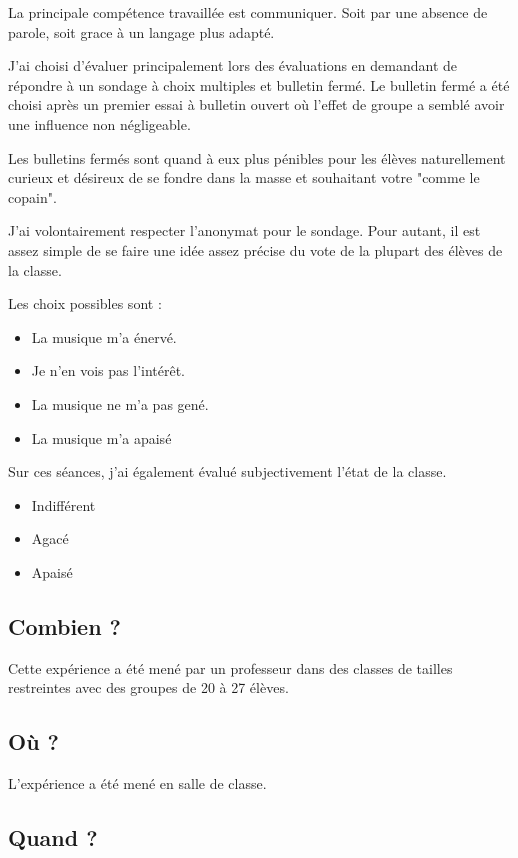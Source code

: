 \documentclass[11pt]{article}
\begin{document}
	La principale compétence travaillée est communiquer. 
	Soit par une absence de parole, soit grace à un langage plus adapté.
	
	J'ai choisi d'évaluer principalement lors des évaluations en demandant de répondre à un sondage à choix multiples et bulletin fermé.
	Le bulletin fermé a été choisi après un premier essai à bulletin ouvert où l’effet de groupe a semblé avoir une influence non négligeable. 
	
	Les bulletins fermés sont quand à eux plus pénibles pour les élèves naturellement curieux et désireux de se fondre dans la masse et souhaitant votre "comme le copain".
	
	J'ai volontairement respecter l'anonymat pour le sondage. Pour autant, il est assez simple de se faire une idée assez précise du vote de la plupart des élèves de la classe.
	
	Les choix possibles sont : 
	
	\begin{itemize}
	\item La musique m'a énervé. 
	      \item Je n'en vois pas l'intérêt.
	      \item La musique ne m'a pas gené.
	      \item La musique m'a apaisé
	\end{itemize}
	
	Sur ces séances, j'ai également évalué subjectivement l'état de la classe.
	
	\begin{itemize}
	\item Indifférent
	      \item Agacé
	      \item Apaisé
	\end{itemize}
	
	\subsection{Combien ?}
	
	Cette expérience a été mené par un professeur dans des classes de tailles restreintes avec des groupes de 20 à 27 élèves.
	
	\subsection{Où ?}
	
	L'expérience a été mené en salle de classe.
	
	\subsection{Quand ?}
	
\end{document}
